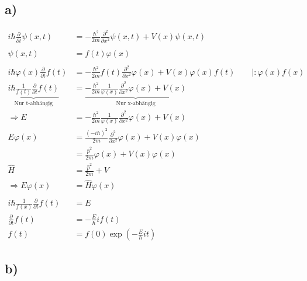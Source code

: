 \subsection{a)}

    \begin{align*}
        i\hbar \frac{\partial}{\partial t} \psi(x, t) &= -\frac{\hbar^2}{2m} \frac{\partial^2}{\partial x^2} \psi(x, t) + V(x) \psi(x, t)\\
        \\
        \psi(x, t) &= f(t)\varphi(x)\\
        \\
        i\hbar \varphi(x) \frac{\partial}{\partial t} f(t) &= -\frac{\hbar^2}{2m} f(t) \frac{\partial^2}{\partial x^2} \varphi(x) + V(x) \varphi(x) f(t) \qquad \vert :\varphi(x)f(x)\\
        \underbrace{i\hbar \frac{1}{f(t)} \frac{\partial}{\partial t}f(t)}_{\text{Nur t-abh\"angig}} &= \underbrace{-\frac{\hbar^2}{2m} \frac{1}{\varphi(x)} \frac{\partial^2}{\partial x^2} \varphi(x) + V(x)}_{\text{Nur x-abh\"angig}}\\
        \Rightarrow E &= -\frac{\hbar^2}{2m} \frac{1}{\varphi(x)} \frac{\partial^2}{\partial x^2} \varphi(x) + V(x)\\
        E \varphi(x) &= \frac{(-i\hbar)^2}{2m} \frac{\partial^2}{\partial x^2} \varphi(x) + V(x) \varphi(x)\\
        &= \frac{\hat{p}^2}{2m} \varphi(x) + V(x) \varphi(x)\\
        \hat{H} &= \frac{\hat{p}^2}{2m} + V\\
        \Rightarrow E \varphi(x) &= \hat{H} \varphi(x)\\
        \\
        i\hbar \frac{1}{f(x)} \frac{\partial}{\partial t} f(t) &= E\\
        \frac{\partial}{\partial t} f(t) &= -\frac{E}{\hbar} i f(t)\\
        f(t) &= f(0) \exp \left( -\frac{E}{\hbar} it \right)
    \end{align*}

\newpage
\subsection{b)}


